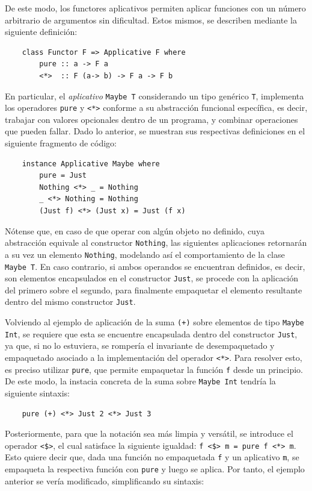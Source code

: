 De este modo, los functores aplicativos permiten aplicar funciones con un número arbitrario de argumentos sin dificultad. Estos mismos, se describen mediante la siguiente definición:

\begin{verbatim}
    class Functor F => Applicative F where
        pure :: a -> F a
        <*>  :: F (a-> b) -> F a -> F b
\end{verbatim}

En particular, el \textit{aplicativo} \verb|Maybe T| considerando un tipo genérico \verb|T|, implementa los operadores \verb|pure| y \verb|<*>| conforme a su abstracción funcional específica, es decir, trabajar con valores opcionales dentro de un programa, y combinar operaciones que pueden fallar. Dado lo anterior, se muestran sus respectivas definiciones en el siguiente fragmento de código:

\begin{verbatim}
    instance Applicative Maybe where
        pure = Just
        Nothing <*> _ = Nothing
        _ <*> Nothing = Nothing
        (Just f) <*> (Just x) = Just (f x)
\end{verbatim}

Nótense que, en caso de que operar con algún objeto no definido, cuya abstracción equivale al constructor \verb|Nothing|, las siguientes aplicaciones retornarán a su vez un elemento \verb|Nothing|, modelando así el comportamiento de la clase \verb|Maybe T|. En caso contrario, si ambos operandos se encuentran definidos, es decir, son elementos encapsulados en el constructor \verb|Just|, se procede con la aplicación del primero sobre el segundo, para finalmente empaquetar el elemento resultante dentro del mismo constructor \verb|Just|. 

Volviendo al ejemplo de aplicación de la suma \verb|(+)| sobre elementos de tipo \verb|Maybe Int|, se requiere que esta se encuentre encapsulada dentro del constructor \verb|Just|, ya que, si no lo estuviera, se rompería el invariante de desempaquetado y empaquetado asociado a la implementación del operador \verb|<*>|. Para resolver esto, es preciso utilizar \texttt{pure}, que permite empaquetar la función \verb|f| desde un principio. De este modo, la instacia concreta de la suma sobre \verb|Maybe Int| tendría la siguiente sintaxis:

\begin{verbatim}
    pure (+) <*> Just 2 <*> Just 3
\end{verbatim}

Posteriormente, para que la notación sea más limpia y versátil, se introduce el operador \verb|<$>|, el cual satisface la siguiente igualdad: \verb|f <$> m = pure f <*> m|. Esto quiere decir que, dada una función no empaquetada \verb|f| y un aplicativo \verb|m|, se empaqueta la respectiva función con \verb|pure| y luego se aplica. Por tanto, el ejemplo anterior se vería modificado, simplificando su sintaxis:

